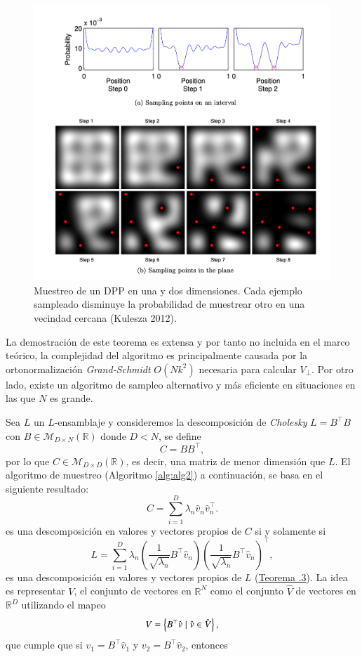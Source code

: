 \begin{figure}[ht]
    \centering
    \includegraphics[width=12cm]{img/tesis/DPP_sampling.png}
    \caption{Muestreo de un DPP en una y dos dimensiones. Cada ejemplo sampleado disminuye la probabilidad de muestrear otro en una vecindad cercana (Kulesza 2012).}
    \label{fig:example}
\end{figure}

La demostración de este teorema es extensa y por tanto no incluida en el marco teórico, la complejidad del algoritmo es principalmente causada por la ortonormalización \textit{Grand-Schmidt} $O(Nk^2)$ necesaria para calcular $V_{\perp}$. Por otro lado, existe un algoritmo de sampleo alternativo y más eficiente en situaciones en las que $N$ es grande. 

\vspace{0.2cm}

Sea $L$ un $L$-ensamblaje y consideremos la descomposición de \textit{Cholesky} $L = B^{\top}B$ con $B \in \mathcal{M}_{D \times N}(\mathbb{R})$ donde $D < N$, se define 
\[
C = BB^{\top}, 
\]
por lo que $C \in \mathcal{M}_{D \times D}(\mathbb{R})$, es decir, una matriz de menor dimensión que $L$. El algoritmo de muestreo (Algoritmo \ref{alg:alg2}) a continuación, se basa en el siguiente resultado: 
\[ 
C = \sum_{i=1}^D \lambda_n\hat{v}_n\hat{v}^{\top}_n.
\]
es una descomposición en valores y vectores propios de $C$ si y solamente si 
\[
L = \sum_{i=1}^D \lambda_n \left ( \frac{1}{\sqrt{\lambda_n}}B^{\top}\hat{v}_n\right ) \left ( \frac{1}{\sqrt{\lambda_n}}B^{\top}\hat{v}_n\right )^{\top},
\]
es una descomposición en valores y vectores propios de $L$ (\hyperlink{Teorema .3}{Teorema .3}). La idea es representar $V$, el conjunto de vectores en $\mathbb{R}^N$ como el conjunto $\hat{V}$ de vectores en $\mathbb{R}^D$ utilizando el mapeo
\[
V = \left \{ B^{\top}\hat{v} \hspace{0.1cm} | \hspace{0.1cm} \hat{v} \in \hat{V} \right \},
\]
que cumple que si $v_1 = B^{\top}\hat{v}_1$ y $v_2 = B^{\top}\hat{v}_2$, entonces 

